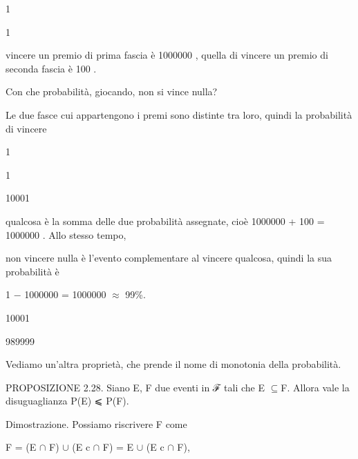\documentclass[a4paper,portrait,12pt]{article}
\begin{document}
1


1


\begin{flushleft}
vincere un premio di prima fascia \`{e} 1000000 , quella di vincere un premio di seconda fascia \`{e} 100 .
\end{flushleft}


\begin{flushleft}
Con che probabilit\`{a}, giocando, non si vince nulla?
\end{flushleft}


\begin{flushleft}
Le due fasce cui appartengono i premi sono distinte tra loro, quindi la probabilit\`{a} di vincere
\end{flushleft}


1


1


10001


\begin{flushleft}
qualcosa \`{e} la somma delle due probabilit\`{a} assegnate, cio\`{e} 1000000 + 100 = 1000000 . Allo stesso tempo,
\end{flushleft}


\begin{flushleft}
non vincere nulla \`{e} l'evento complementare al vincere qualcosa, quindi la sua probabilit\`{a} \`{e}
\end{flushleft}


1 $-$ 1000000 = 1000000 $\approx$ 99\%.


10001





989999





\begin{flushleft}
Vediamo un'altra propriet\`{a}, che prende il nome di monotonia della probabilit\`{a}.
\end{flushleft}


\begin{flushleft}
PROPOSIZIONE 2.28. Siano E, F due eventi in ℱ tali che E $\subseteq$F. Allora vale la disuguaglianza P(E) ⩽ P(F).
\end{flushleft}


\begin{flushleft}
Dimostrazione. Possiamo riscrivere F come
\end{flushleft}


\begin{flushleft}
F = (E $\cap$ F) $\cup$ (E c $\cap$ F) = E $\cup$ (E c $\cap$ F),
\end{flushleft}
\end{document}
